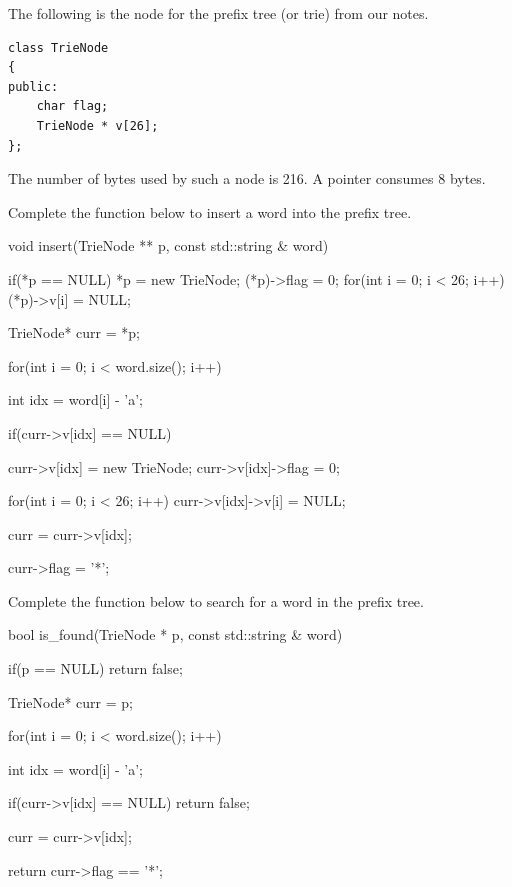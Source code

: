 

The following is the node for the prefix tree (or trie) from our notes.
\begin{Verbatim}[frame=single,fontsize=\footnotesize]
class TrieNode
{
public:
    char flag;
    TrieNode * v[26];
};
\end{Verbatim}
The number of bytes used by such a node is 216.
A pointer consumes 8 bytes.

\nextq
Complete the function below to insert a word into the prefix tree.
\\
\ANSWER
\begin{answercode}
void insert(TrieNode ** p, const std::string & word)
{
  if(*p == NULL)
  {
    *p = new TrieNode;
    (*p)->flag = 0;
    for(int i = 0; i < 26; i++)
      (*p)->v[i] = NULL;
  }

  TrieNode* curr = *p;

  for(int i = 0; i < word.size(); i++)
  {
    int idx = word[i] - 'a';

    if(curr->v[idx] == NULL)
    {
      curr->v[idx] = new TrieNode;
      curr->v[idx]->flag = 0;
      
      for(int i = 0; i < 26; i++)
        curr->v[idx]->v[i] = NULL;
    }
    curr = curr->v[idx];
  }
  curr->flag = '*';
}
\end{answercode}

\nextq
Complete the function below to search for a word in the prefix tree.
\\
\ANSWER
\begin{answercode}
bool is_found(TrieNode * p, const std::string & word)
{
  if(p == NULL)
    return false;

  TrieNode* curr = p;

  for(int i = 0; i < word.size(); i++)
  {
    int idx = word[i] - 'a';

    if(curr->v[idx] == NULL)
      return false;

    curr = curr->v[idx];
  }

  return curr->flag == '*';
}
\end{answercode}

